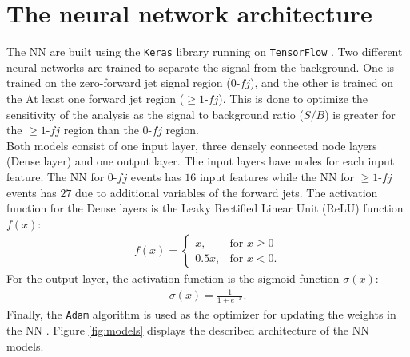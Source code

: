 \section{The neural network architecture}
\label{sec:arch}
The NN are built using the \texttt{Keras} library running on \texttt{TensorFlow} \cite{Keras} \cite{tensorflow}.
Two different neural networks are trained to separate the signal from the background. One is trained on the zero-forward jet signal region ($0\text{-}fj$), and the other is trained on the At least one forward jet region ($\geq 1\text{-}fj$). 
This is done to optimize the sensitivity of the analysis as the signal to background ratio ($S/B$) is greater for the $\geq 1\text{-}fj$ region than the $0\text{-}fj$ region. \\
Both models consist of one input layer, three densely connected node layers (Dense layer) and one output layer. The input layers have nodes for each input feature. The NN for $0\text{-}fj$ events has $16$ input features while the NN for $\geq 1\text{-}fj$ events has $27$ due to additional variables of the forward jets. 
The activation function for the Dense layers is the Leaky Rectified Linear Unit (ReLU) function $f(x)$:
\begin{align*}
    f(x) =\begin{cases}
            x, & \text{for } x \geq 0\\
            0.5x, & \text{for } x < 0.
        \end{cases}
\end{align*}
For the output layer, the activation function is the sigmoid function $\sigma(x)$:
\begin{align*}
    \sigma(x) = \frac{1}{1+ e^{-x}}. 
\end{align*}
Finally, the \texttt{Adam} algorithm is used as the optimizer for updating the weights in the NN \cite{Adam}. Figure \ref{fig:models} displays the described architecture of the NN models. 

